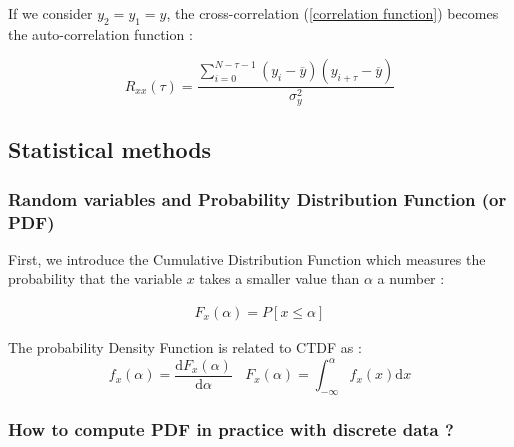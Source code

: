 If we consider \(y_2 = y_1 = y\), the cross-correlation (\ref{correlation function}) becomes the auto-correlation function :

\begin{equation}
    R_{xx}(\tau) = \frac{\sum_{i=0}^{N-\tau-1}(y_i - \overline{y})(y_{i+\tau}-\overline{y})}{\sigma_y ^2}
\end{equation}


\subsection{Statistical methods}

\subsubsection{Random variables and Probability Distribution Function (or PDF)}

First, we introduce the Cumulative Distribution Function which measures the probability that the variable \(x\) takes a smaller value than \(\alpha\) a number : 

\begin{gather*}
    F_x(\alpha) = P[x \leq \alpha]
\end{gather*}

The probability Density Function is related to CTDF as : 
\begin{equation*}
    f_x (\alpha) = \frac{\textrm{d}F_x (\alpha)}{\textrm{d}\alpha} ~~~~ F_x (\alpha) = \int_{-\infty}^{\alpha}f_x(x) \textrm{d}x
\end{equation*}

\newpage
\subsubsection{How to compute PDF in practice with discrete data ?}

